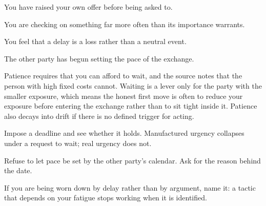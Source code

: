 \begin{feedback}
  \item You have raised your own offer before being asked to.
  \item You are checking on something far more often than its importance warrants.
  \item You feel that a delay is a loss rather than a neutral event.
  \item The other party has begun setting the pace of the exchange.
\end{feedback}

\begin{failure}
Patience requires that you can afford to wait, and the source notes that the person with high fixed costs cannot. Waiting is a lever only for the party with the smaller exposure, which means the honest first move is often to reduce your exposure before entering the exchange rather than to sit tight inside it. Patience also decays into drift if there is no defined trigger for acting.
\end{failure}

\begin{countermeasures}
  \item Impose a deadline and see whether it holds. Manufactured urgency collapses under a request to wait; real urgency does not.
  \item Refuse to let pace be set by the other party's calendar. Ask for the reason behind the date.
  \item If you are being worn down by delay rather than by argument, name it: a tactic that depends on your fatigue stops working when it is identified.
\end{countermeasures}

\seesources
{}
